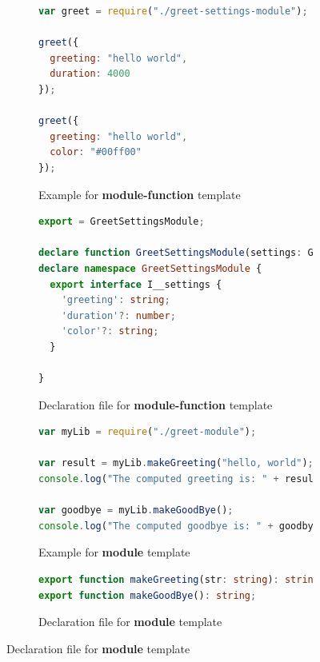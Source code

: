 \documentclass[english,cleveref,autoref,submission]{programming}
\begin{document}
\begin{figure}[tp]
  \centering
  \begin{subfigure}{0.48\linewidth}
    \begin{lstlisting}[language=JavaScript,numbers=none]
var greet = require("./greet-settings-module");

greet({
  greeting: "hello world",
  duration: 4000
});

greet({
  greeting: "hello world",
  color: "#00ff00"
});
    \end{lstlisting}
    \caption{Example for \textbf{module-function} template}
    \label{fig:example-module-function}
  \end{subfigure}
  \hfill
  \begin{subfigure}{0.48\linewidth}
    \begin{lstlisting}[language=TypeScript,numbers=none]
export = GreetSettingsModule;

declare function GreetSettingsModule(settings: GreetSettingsModule.I__settings): void;
declare namespace GreetSettingsModule {
  export interface I__settings {
    'greeting': string;
    'duration'?: number;
    'color'?: string;
  }

}
    \end{lstlisting}
    \caption{Declaration file for \textbf{module-function} template}
    \label{fig:template-module-function}
  \end{subfigure}

  \begin{subfigure}{0.48\linewidth}
      \begin{lstlisting}[language=JavaScript,numbers=none]
var myLib = require("./greet-module");

var result = myLib.makeGreeting("hello, world");
console.log("The computed greeting is: " + result);

var goodbye = myLib.makeGoodBye();
console.log("The computed goodbye is: " + goodbye);    
      \end{lstlisting}
    \caption{Example for \textbf{module} template}
    \label{fig:example-module}
    \end{subfigure}
    \hfill
    \begin{subfigure}{0.48\linewidth}
      \begin{lstlisting}[language=TypeScript,numbers=none]
export function makeGreeting(str: string): string;
export function makeGoodBye(): string;        
      \end{lstlisting}
      \caption{Declaration file for \textbf{module} template}
      \label{fig:template-module}
    \end{subfigure}


\end{figure}
\end{document}
